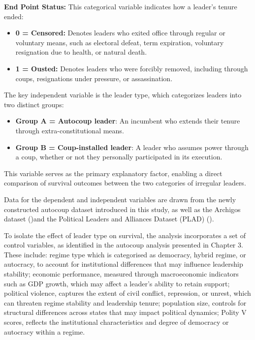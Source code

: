 \documentclass[
  12pt,
]{report}
\providecommand{\tightlist}{%
  \setlength{\itemsep}{0pt}\setlength{\parskip}{0pt}}
\begin{document}
\textbf{End Point Status:} This categorical variable indicates how a
leader's tenure ended:

\begin{itemize}
\item
  \textbf{0 = Censored:} Denotes leaders who exited office through
  regular or voluntary means, such as electoral defeat, term expiration,
  voluntary resignation due to health, or natural death.
\item
  \textbf{1 = Ousted:} Denotes leaders who were forcibly removed,
  including through coups, resignations under pressure, or
  assassination.
\end{itemize}

The key independent variable is the leader type, which categorizes
leaders into two distinct groups:

\begin{itemize}
\tightlist
\item
  \textbf{Group A = Autocoup leader}: An incumbent who extends their
  tenure through extra-constitutional means.
\item
  \textbf{Group B = Coup-installed leader}: A leader who assumes power
  through a coup, whether or not they personally participated in its
  execution.
\end{itemize}

This variable serves as the primary explanatory factor, enabling a
direct comparison of survival outcomes between the two categories of
irregular leaders.

Data for the dependent and independent variables are drawn from the
newly constructed autocoup dataset introduced in this study, as well as
the Archigos dataset ()and the Political Leaders and Alliances Dataset (PLAD)
().

To isolate the effect of leader type on survival, the analysis
incorporates a set of control variables, as identified in the autocoup
analysis presented in Chapter 3. These include: regime type which is
categorised as democracy, hybrid regime, or autocracy, to account for
institutional differences that may influence leadership stability;
economic performance, measured through macroeconomic indicators such as
GDP growth, which may affect a leader's ability to retain support;
political violence, captures the extent of civil conflict, repression,
or unrest, which can threaten regime stability and leadership tenure;
population size, controls for structural differences across states that
may impact political dynamics; Polity V scores, reflects the
institutional characteristics and degree of democracy or autocracy
within a regime.
\end{document}
